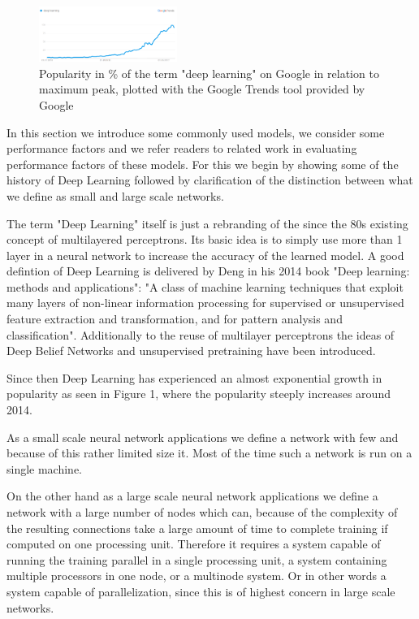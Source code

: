 \documentclass[conference]{IEEEtran}
\begin{document}
\begin{figure}
\centering
\includegraphics[width=0.4\textwidth]{pop.png}
\caption{Popularity in \% of the term "deep learning" on Google in relation to maximum peak, plotted with the Google Trends tool provided by Google}
\end{figure}


In this section we introduce some commonly used models, we consider some performance factors and we refer readers to related work in evaluating performance factors of these models. For this we begin by showing some of the history of Deep Learning followed by clarification of the distinction between what we define as small and large scale networks.

The term "Deep Learning" itself is just a rebranding of the since the 80s existing concept of multilayered perceptrons. Its basic idea is to simply use more than 1 layer in a neural network to increase the accuracy of the learned model\cite{deeplearning101}. A good defintion of Deep Learning is delivered by Deng in his 2014 book "Deep learning: methods and applications"\cite{deng2014deep}: "A class of machine learning techniques that exploit many layers of non-linear information processing for supervised or unsupervised feature extraction and transformation, and for pattern analysis and classification". Additionally to the reuse of multilayer perceptrons the ideas of Deep Belief Networks and unsupervised pretraining have been introduced.

Since then Deep Learning has experienced an almost exponential growth in popularity as seen in Figure 1, where the popularity steeply increases around 2014.


As a small scale neural network applications we define a network with few and because of this rather limited size it. Most of the time such a network is run on a single machine.



On the other hand as a large scale neural network applications we define a network with a large number of nodes which can, because of the complexity of the resulting connections take a large amount of time to complete training if computed on one processing unit. Therefore it requires a system capable of running the training parallel in a single processing unit, a system containing multiple processors in one node, or a multinode system. Or in other words a system capable of parallelization, since this is of highest concern in large scale networks.
\end{document}
